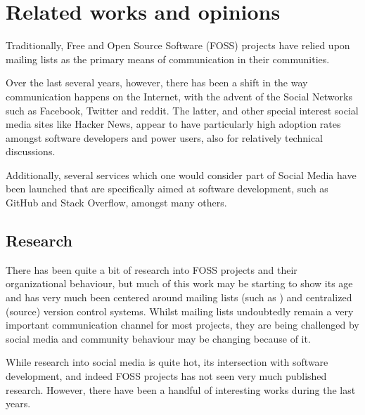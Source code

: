 \documentclass[a4paper,11pt]{article} %
\begin{document}
\section{Related works and opinions}



Traditionally, Free and Open Source Software (FOSS) projects have
relied upon mailing lists as the primary means of communication in
their communities. %

Over the last several years, however, there has been a shift in the
way communication happens on the Internet, with the advent of the
Social Networks such as Facebook, Twitter and reddit. The latter, and
other special interest social media sites like Hacker News, appear to
have particularly high adoption rates amongst software developers and
power users, also for relatively technical discussions.

Additionally, several services which one would consider part of Social
Media have been launched that are specifically aimed at software
development, such as GitHub and Stack Overflow, amongst many others.

\subsection{Research}
There has been quite a bit of research into FOSS projects and their
organizational behaviour, but much of this work may be starting to
show its age and has very much been centered around mailing lists
(such as \cite{Oezbek10Cancer, singh2011network}) and centralized (source) version
control systems. Whilst mailing lists undoubtedly remain a very
important communication channel for most projects, they are being
challenged by social media and community behaviour may be changing
because of it.

While research into social media is quite hot, its intersection with
software development, and indeed FOSS projects has not seen very much
published research. However, there have been a handful of interesting
works during the last years.
\end{document}
